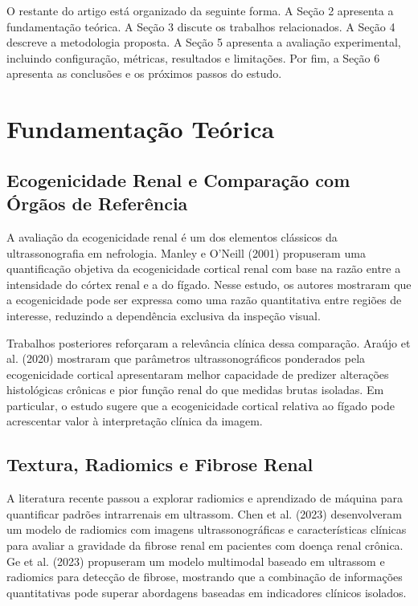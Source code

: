 \documentclass[12pt]{article}
\begin{document}
O restante do artigo está organizado da seguinte forma. A Seção 2 apresenta a fundamentação teórica. A Seção 3 discute os trabalhos relacionados. A Seção 4 descreve a metodologia proposta. A Seção 5 apresenta a avaliação experimental, incluindo configuração, métricas, resultados e limitações. Por fim, a Seção 6 apresenta as conclusões e os próximos passos do estudo.

\section{Fundamentação Teórica}

\subsection{Ecogenicidade Renal e Comparação com Órgãos de Referência}

A avaliação da ecogenicidade renal é um dos elementos clássicos da ultrassonografia em nefrologia. Manley e O'Neill (2001) propuseram uma quantificação objetiva da ecogenicidade cortical renal com base na razão entre a intensidade do córtex renal e a do fígado. Nesse estudo, os autores mostraram que a ecogenicidade pode ser expressa como uma razão quantitativa entre regiões de interesse, reduzindo a dependência exclusiva da inspeção visual.

Trabalhos posteriores reforçaram a relevância clínica dessa comparação. Araújo et al. (2020) mostraram que parâmetros ultrassonográficos ponderados pela ecogenicidade cortical apresentaram melhor capacidade de predizer alterações histológicas crônicas e pior função renal do que medidas brutas isoladas. Em particular, o estudo sugere que a ecogenicidade cortical relativa ao fígado pode acrescentar valor à interpretação clínica da imagem.

\subsection{Textura, Radiomics e Fibrose Renal}

A literatura recente passou a explorar radiomics e aprendizado de máquina para quantificar padrões intrarrenais em ultrassom. Chen et al. (2023) desenvolveram um modelo de radiomics com imagens ultrassonográficas e características clínicas para avaliar a gravidade da fibrose renal em pacientes com doença renal crônica. Ge et al. (2023) propuseram um modelo multimodal baseado em ultrassom e radiomics para detecção de fibrose, mostrando que a combinação de informações quantitativas pode superar abordagens baseadas em indicadores clínicos isolados.
\end{document}
